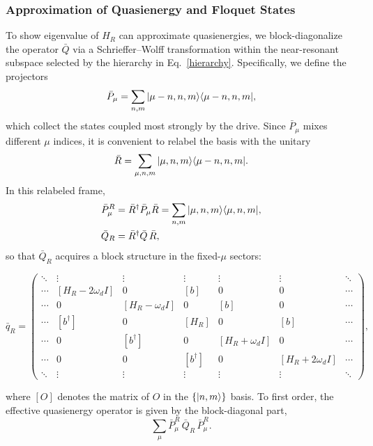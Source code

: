 \subsubsection{Approximation of Quasienergy and Floquet States}
To show eigenvalue of $H_R$ can approximate quasienergies, we block-diagonalize the operator $\bar Q$  via a Schrieffer--Wolff transformation within the near-resonant subspace selected by the hierarchy in Eq.~\eqref{hierarchy}. Specifically, we define the projectors
\begin{equation}
    \bar P_\mu=\sum_{n,m}|\mu-n,n,m\rangle\langle\mu-n,n,m|,
\end{equation}
which collect the states coupled most strongly by the drive. Since $\bar P_\mu$ mixes different $\mu$ indices, it is convenient to relabel the basis with the unitary
\begin{equation}
    \bar R=\sum_{\mu,n,m}|\mu,n,m\rangle\langle\mu-n,n,m|.
\end{equation}
In this relabeled frame,
\begin{align}
    \bar P_\mu^{R} &= \bar R^\dagger \bar P_\mu \bar R
    =\sum_{n,m}|\mu,n,m\rangle\langle\mu,n,m|,\\
    \bar Q_{R} &= \bar R^\dagger \bar Q\,\bar R,
\end{align}
so that $\bar Q_R$ acquires a block structure in the fixed-$\mu$ sectors:
\begin{widetext}
\begin{equation}
    \bar q_R=
    \begin{pmatrix}
     \ddots & \vdots & \vdots & \vdots & \vdots & \vdots & \ddots \\
     \cdots & [H_R-2\omega_d I] & 0 & [b] & 0 & 0 & \cdots \\
     \cdots & 0 & [H_R-\omega_d I] & 0 & [b] & 0 & \cdots \\
     \cdots & [b^\dagger] & 0 & [H_R] & 0 & [b] & \cdots \\
     \cdots & 0 & [b^\dagger] & 0 & [H_R+\omega_d I] & 0 & \cdots \\
     \cdots & 0 & 0 & [b^\dagger] & 0 & [H_R+2\omega_d I] & \cdots \\
     \ddots & \vdots & \vdots & \vdots & \vdots & \vdots & \ddots
    \end{pmatrix},
\end{equation}
\end{widetext}
where $[O]$ denotes the matrix of $O$ in the $\{|n,m\rangle\}$ basis. To first order, the effective quasienergy operator is given by the block-diagonal part,
\begin{equation}
    \sum_\mu \bar P_\mu^{R}\,\bar Q_R\,\bar P_\mu^{R}.
\end{equation}
